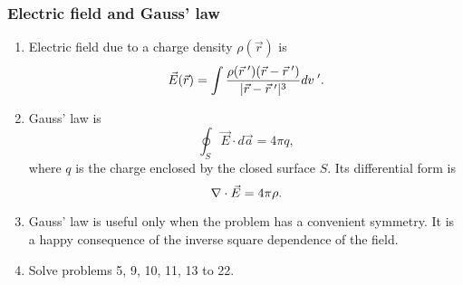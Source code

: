 \documentclass{beamer}
\begin{document}
\begin{frame}
\frametitle{Electric field and Gauss' law}
\begin{enumerate}
\item Electric field due to a charge density $\rho(\vec{r})$ is
\begin{equation}\label{e6}
\vec{E}(\vec{r})  = \int\frac{\rho(\vec{r}^{\;\prime})(\vec{r} - \vec{r}^{\;\prime})}{|\vec{r} - \vec{r}^{\;\prime}|^3}dv^{\;\prime}.
\end{equation}
\item Gauss' law is
\begin{equation}\label{e7}
\oint_S \vec{E}\cdot d\vec{a} = 4\pi q,
\end{equation}
where $q$ is the charge enclosed by the closed surface $S$. Its differential form is
\begin{equation}\label{e8}
\nabla\cdot\vec{E} = 4\pi\rho.
\end{equation}

\item Gauss' law is useful only when the problem has a convenient symmetry. It is a happy consequence of
the inverse square dependence of the field.

\item Solve problems 5, 9, 10, 11, 13 to 22.
\end{enumerate}
\end{frame}
\end{document}
